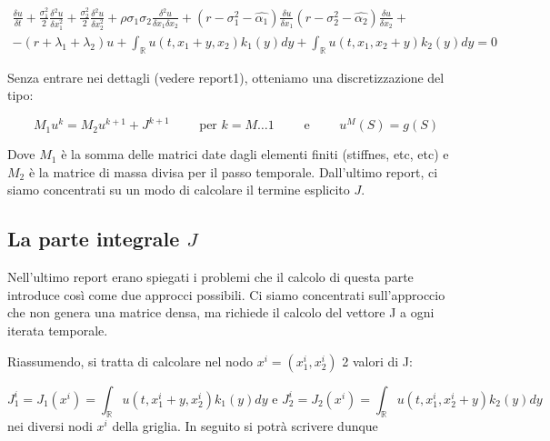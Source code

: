 \documentclass[a4paper,10pt]{article}
\newcommand{\der}[2]{\frac{\delta #1}{\delta #2}}
\newcommand{\dder}[2]{\frac{\delta^2 #1}{\delta #2^2}}
\newcommand{\dmix}[3]{\frac{\delta^2 #1}{\delta #2 \delta #3}}
\begin{document}
{
\small
\begin{multline}
 \der{u}{t}+\frac{\sigma_1^2}{2}\dder{u}{x_1}+\frac{\sigma_2^2}{2}\dder{u}{x_2}+\rho\sigma_1\sigma_2\dmix{u}{x_1}{x_2}+
 \left(r-\sigma_1^2-\hat{\alpha_1}\right)\der{u}{x_1}
 \left(r-\sigma_2^2-\hat{\alpha_2}\right)\der{u}{x_2}+\\-(r+\lambda_1+\lambda_2)u+
 \int_\mathbb{R}u(t,x_1+y,x_2)k_1(y)dy+
 \int_\mathbb{R}u(t,x_1,x_2+y)k_2(y)dy=0
 \label{eq:costcoeff2}
\end{multline}
}


Senza entrare nei dettagli (vedere report1), otteniamo una discretizzazione del tipo:

\begin{equation}
 M_1u^k=M_2u^{k+1}+J^{k+1}  \qquad \text{ per } k=M\dots1 \qquad \text{ e } \qquad u^{M}(S)=g(S) 
\end{equation}

Dove $M_1$ è la somma delle matrici date dagli elementi finiti (stiffnes, etc, etc) e $M_2$ è la matrice di massa divisa per il passo temporale. Dall'ultimo report, ci siamo concentrati su un modo di calcolare il termine esplicito $J$.

\subsection{La parte integrale $J$}

Nell'ultimo report erano spiegati i problemi che il calcolo di questa parte introduce così come due approcci possibili. Ci siamo concentrati sull'approccio che non genera una matrice densa, ma richiede il calcolo del vettore J a ogni iterata temporale.

Riassumendo, si tratta di calcolare nel nodo $x^i=(x_1^i,x_2^i)$ 2 valori di J: 

\begin{equation*}
 J_1^i=J_1(x^i)=\int_\mathbb{R}u(t,x_1^i+y,x_2^i)k_1(y)dy \text{ e } J_2^i=J_2(x^i)=\int_\mathbb{R}u(t,x_1^i,x_2^i+y)k_2(y)dy
\end{equation*}
nei diversi nodi $x^i$ della griglia. In seguito si potrà scrivere dunque 
\end{document}
